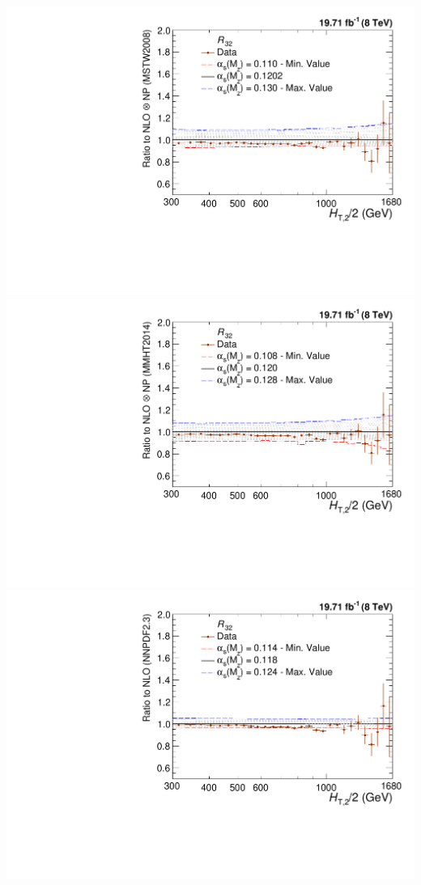 \documentclass{beamer}
\begin{document}
\begin{frame}
\begin{center}
\includegraphics[scale = 0.207]{Plots_HT_2_150/Sensitivity_double_ratio_32_MSTW2008.pdf}\\
\vspace{5mm}
\includegraphics[scale = 0.207]{Plots_HT_2_150/Sensitivity_double_ratio_32_MMHT2014.pdf}%
\hspace{0.3mm}
\includegraphics[scale = 0.207]{Plots_HT_2_150/Sensitivity_double_ratio_32_NNPDF23.pdf}
\end{center}
\end{frame}
\end{document}
